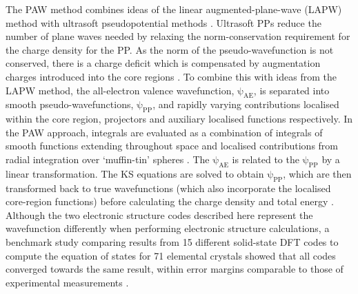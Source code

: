 \documentclass[11pt, twoside]{report}
\begin{document}
The PAW method combines ideas of the linear augmented-plane-wave (LAPW) method \cite{LAPW} with ultrasoft pseudopotential methods \cite{ultrasoft_PP, ultrasoft_PP_VASP, VASP_wiki_PAW}. Ultrasoft PPs reduce the number of plane waves needed by relaxing the norm-conservation requirement for the charge density for the PP. As the norm of the pseudo-wavefunction is not conserved, there is a charge deficit which is compensated by augmentation charges introduced into the core regions \cite{Prasad_ch5}. To combine this with ideas from the LAPW method, the all-electron valence wavefunction, $\mathrm{\psi_{AE}}$, is separated into smooth pseudo-wavefunctions, $\mathrm{\psi_{PP}}$, and rapidly varying contributions localised within the core region, projectors and auxiliary localised functions respectively. In the PAW approach, integrals are evaluated as a combination of integrals of smooth functions extending throughout space and localised contributions from radial integration over `muffin-tin' spheres \cite{RichardMartin_Ch11}. The $\mathrm{\psi_{AE}}$ is related to the $\mathrm{\psi_{PP}}$ by a linear transformation. The KS equations are solved to obtain $\mathrm{\psi_{PP}}$, which are then transformed back to true wavefunctions (which also incorporate the localised core-region functions) before calculating the charge density and total energy \cite{Prasad_ch5}.
Although the two electronic structure codes described here represent the wavefunction differently when performing electronic structure calculations, a benchmark study comparing results from 15 different solid-state DFT codes to compute the equation of states for 71 elemental crystals showed that all codes converged towards the same result, within error margins comparable to those of experimental measurements \cite{delta_project}. 




\end{document}
